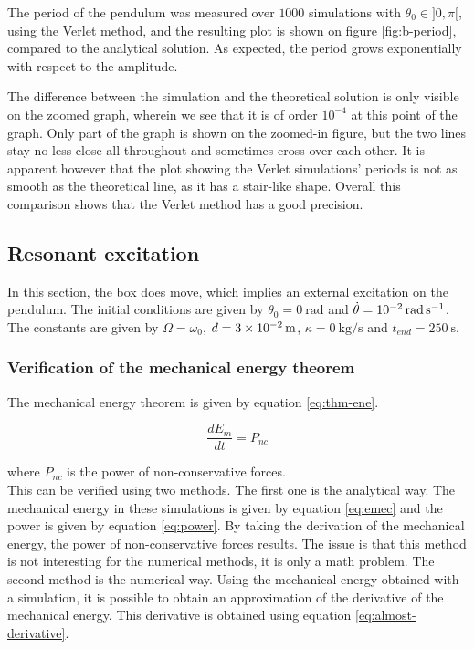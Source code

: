 \documentclass[a4paper,12pt,twoside]{article}
\begin{document}
The period of the pendulum was measured over $1000$ simulations with $\theta_0 \in ]0,\pi[$, using the Verlet method, and the resulting plot is shown on figure \ref{fig:b-period}, compared to the analytical solution. As expected, the period grows exponentially with respect to the amplitude.

The difference between the simulation and the theoretical solution is only visible on the zoomed graph, wherein we see that it is of order $10^{-4}$ at this point of the graph. Only part of the graph is shown on the zoomed-in figure, but the two lines stay no less close all throughout and sometimes cross over each other. It is apparent however that the plot showing the Verlet simulations' periods is not as smooth as the theoretical line, as it has a stair-like shape. Overall this comparison shows that the Verlet method has a good precision. %


\subsection{Resonant excitation}

In this section, the box does move, which implies an external excitation on the pendulum.
The initial conditions are given by $\theta_0 = \SI{0}{\radian}$ and $\dot{\theta} = \SI{d-2}{\radian\per\second}$.
The constants are given by $\Omega = \omega_0$, $d = \SI{3d-2}{\m}$, $\kappa = \SI{0}{\kg\per\s}$ and $t_{end} = \SI{250}{\s}$.

\subsubsection{Verification of the mechanical energy theorem}\label{sec:c-thm}
The mechanical energy theorem is given by equation \ref{eq:thm-ene}. \cite{wiki:en-cin}

\begin{equation}
	\frac{dE_m}{dt} = P_{nc}
	\label{eq:thm-ene}
\end{equation}

where $P_{nc}$ is the power of non-conservative forces.\\

This can be verified using two methods.
The first one is the analytical way.
The mechanical energy in these simulations is given by equation \ref{eq:emec} and the power is given by equation \ref{eq:power}.
By taking the derivation of the mechanical energy, the power of non-conservative forces results.
The issue is that this method is not interesting for the numerical methods, it is only a math problem. %
The second method is the numerical way.
Using the mechanical energy obtained with a simulation, it is possible to obtain an approximation of the derivative of the mechanical energy. %
This derivative is obtained using equation \ref{eq:almost-derivative}.
\end{document}
